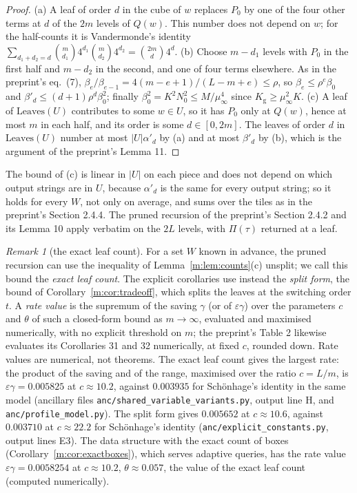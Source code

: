 \documentclass[11pt]{article}
\theoremstyle{definition}
\theoremstyle{remark}
\newtheorem{remark}[theorem]{Remark}
\newcommand{\Leaves}{\mathrm{Leaves}}
\newcommand{\Nz}{N_0}
\newcommand{\Kg}{K_{\mathrm g}}
\newcommand{\EpsGammaFullSup}{0.0058254}%
\begin{document}
\begin{proof}
(a) A leaf of order $d$ in the cube of $w$ replaces $P_0$ by one of the four other terms at $d$ of the $2m$ levels of $Q(w)$. This number does not depend on $w$; for the half-counts it is Vandermonde's identity $\sum_{d_1+d_2=d}\binom m{d_1}4^{d_1}\binom m{d_2}4^{d_2}=\binom{2m}d4^d$. (b) Choose $m-d_1$ levels with $P_0$ in the first half and $m-d_2$ in the second, and one of four terms elsewhere. As in the preprint's eq.~(7), $\beta_e/\beta_{e-1}=4(m-e+1)/(L-m+e)\le\rho$, so $\beta_e\le\rho^e\beta_0$ and $\beta'_d\le(d+1)\rho^d\beta_0^2$; finally $\beta_0^2=K^2\Nz^2\le M/\mu_\infty^4$ since $\Kg\ge\mu_\infty^2 K$. (c) A leaf of $\Leaves(U)$ contributes to some $w\in U$, so it has $P_0$ only at $Q(w)$, hence at most $m$ in each half, and its order is some $d\in[0,2m]$. The leaves of order $d$ in $\Leaves(U)$ number at most $|U|\alpha'_d$ by (a) and at most $\beta'_d$ by (b), which is the argument of the preprint's Lemma 11.
\end{proof}

The bound of (c) is linear in $|U|$ on each piece and does not depend on which output strings are in $U$, because $\alpha'_d$ is the same for every output string; so it holds for every $W$, not only on average, and sums over the tiles as in the preprint's Section 2.4.4. The pruned recursion of the preprint's Section 2.4.2 and its Lemma 10 apply verbatim on the $2L$ levels, with $\Pi(\tau)$ returned at a leaf.

\begin{remark}[the exact leaf count]\label{m:rem:exact}
For a set $W$ known in advance, the pruned recursion can use the inequality of Lemma~\ref{m:lem:counts}(c) unsplit; we call this bound the \emph{exact leaf count}. The explicit corollaries use instead the \emph{split form}, the bound of Corollary~\ref{m:cor:tradeoff}, which splits the leaves at the switching order $t$. A \emph{rate value} is the supremum of the saving $\gamma$ (or of $\varepsilon\gamma$) over the parameters $c$ and $\theta$ of such a closed-form bound as $m\to\infty$, evaluated and maximised numerically, with no explicit threshold on $m$; the preprint's Table 2 likewise evaluates its Corollaries 31 and 32 numerically, at fixed $c$, rounded down. Rate values are numerical, not theorems. The exact leaf count gives the largest rate: the product of the saving and of the range, maximised over the ratio $c=L/m$, is $\varepsilon\gamma=0.005825$ at $c\approx10.2$, against $0.003935$ for Schönhage's identity in the same model (ancillary files \texttt{anc/shared\_variable\_variants.py}, output line H, and \texttt{anc/profile\_model.py}). The split form gives $0.005652$ at $c\approx10.6$, against $0.003710$ at $c\approx22.2$ for Schönhage's identity (\texttt{anc/explicit\_constants.py}, output lines E3).
The data structure with the exact count of boxes (Corollary~\ref{m:cor:exactboxes}), which serves adaptive queries, has the rate value $\varepsilon\gamma=\EpsGammaFullSup$ at $c\approx10.2$, $\theta\approx0.057$, the value of the exact leaf count (computed numerically).
\end{remark}
\end{document}
